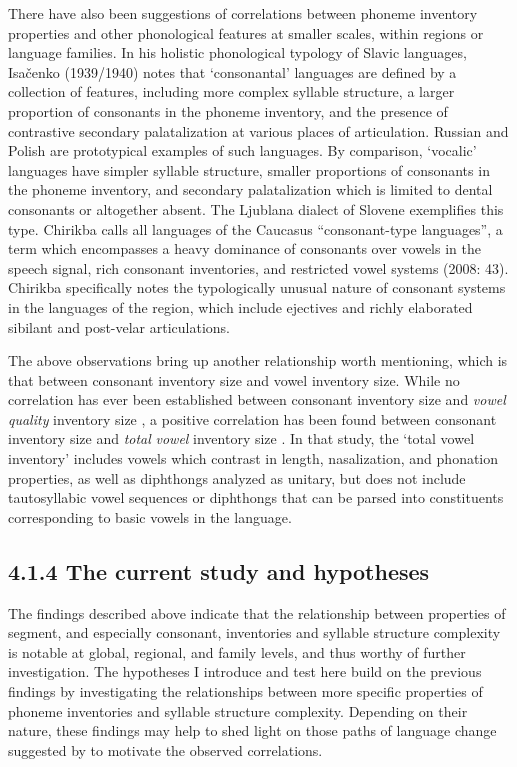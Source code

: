   There have also been suggestions of correlations between phoneme inventory properties and other phonological features at smaller scales, within regions or language families. In his holistic phonological typology of Slavic languages, Isačenko (1939/1940) notes that ‘consonantal’ languages are defined by a collection of features, including more complex syllable structure, a larger proportion of consonants in the phoneme inventory, and the presence of contrastive secondary palatalization at various places of articulation. Russian and Polish are prototypical examples of such languages. By comparison, ‘vocalic’ languages have simpler syllable structure, smaller proportions of consonants in the phoneme inventory, and secondary palatalization which is limited to dental consonants or altogether absent. The Ljublana dialect of Slovene exemplifies this type. Chirikba calls all languages of the Caucasus “consonant-type languages”, a term which encompasses a heavy dominance of consonants over vowels in the speech signal, rich consonant inventories, and restricted vowel systems (2008: 43). Chirikba specifically notes the typologically unusual nature of consonant systems in the languages of the region, which include ejectives and richly elaborated sibilant and post-velar articulations.



  The above observations bring up another relationship worth mentioning, which is that between consonant inventory size and vowel inventory size. While no correlation has ever been established between consonant inventory size and \textit{vowel} \textit{quality} inventory size \citep{Maddieson2013c}, a positive correlation has been found between consonant inventory size and \textit{total} \textit{vowel} inventory size \citep{Maddieson2011}. In that study, the ‘total vowel inventory’ includes vowels which contrast in length, nasalization, and phonation properties, as well as diphthongs analyzed as unitary, but does not include tautosyllabic vowel sequences or diphthongs that can be parsed into constituents corresponding to basic vowels in the language.


\subsection{4.1.4 The current study and hypotheses}

  The findings described above indicate that the relationship between properties of segment, and especially consonant, inventories and syllable structure complexity is notable at global, regional, and family levels, and thus worthy of further investigation. The hypotheses I introduce and test here build on the previous findings by investigating the relationships between more specific properties of phoneme inventories and syllable structure complexity. Depending on their nature, these findings may help to shed light on those paths of language change suggested by \citet{Maddieson2006} to motivate the observed correlations.



